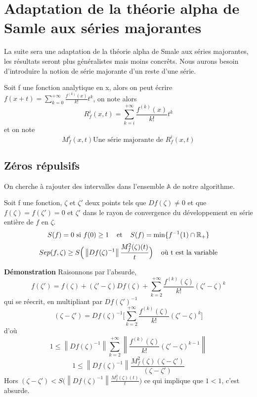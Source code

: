 \documentclass[a4paper,10.5pt]{article}
\begin{document}
	
	\section{Adaptation de la théorie alpha de Samle aux séries majorantes}
	
	La suite sera une adaptation de la théorie alpha de Smale aux séries majorantes, les résultats seront plus généralistes mais moins concrêts. 
	Nous aurons besoin d'introduire la notion de série majorante d'un reste d'une série. 
	
	\begin{definition} Soit f une fonction analytique en x, alors on peut écrire $f(x+t)=\sum_{k=0}^{+\infty} \frac{f^{(k)}(x)}{k!}t^{k}$, on note alors 
	\[R_{f}^{i}(x,t)=\sum_{k=i}^{+\infty} \frac{f^{(k)}(x)}{k!}t^{k}\]
	et on note
	\[M_{f}^{i}(x,t) \text{Une série majorante de } R_{f}^{i}(x,t)\]
	\end{definition}
	
	\subsection{Zéros répulsifs}
	
	On cherche à rajouter des intervalles dans l'ensemble $\mathbb{A}$ de notre algorithme. 
	
	\begin{theorem}	Soit f une fonction, $\zeta$ et $\zeta '$ deux points tels que $Df(\zeta)\neq 0$ et que $f(\zeta)=f(\zeta ')=0$ et $\zeta '$ dans le rayon de convergence du développement en série entière de $f$ en $\zeta$. 
		\[S(f)=0 \text{ si } f(0) \geq 1  \hspace{4mm} \text{et} \hspace{4mm} S(f)=\min \{f^{-1}(1)\cap \mathbb{R}_{+}\}\]
		\[Sep(f,\zeta) \geq S\Big(\left\|Df(\zeta)^{-1}\right\|\frac{M_{f}^{2}(\zeta)(t)}{t}\Big) \hspace{4mm} \text{où t est la variable} \]
	\end{theorem}
	
	\noindent \textbf{Démonstration} Raisonnons par l'absurde, 
	\[f(\zeta ')=f(\zeta)+(\zeta '-\zeta)Df(\zeta)+ \sum_{k=2}^{+\infty}\frac{f^{(k)}(\zeta)}{k!}(\zeta'-\zeta)^k\]
	qui se réecrit, en multipliant par $Df(\zeta ')^{-1}$
	\[(\zeta-\zeta')=Df(\zeta)^{-1} \Big[\sum_{k=2}^{+\infty}\frac{f^{(k)}(\zeta)}{k!}(\zeta'-\zeta)^k\Big]\]
	d'où 
	\[1 \leq \left\|Df(\zeta)^{-1} \right\|\sum_{k=2}^{+\infty}  \left\|\frac{f^{(k)}(\zeta)}{k!}(\zeta'-\zeta)^{k-1} \right\|\]
	\[1 \leq \left\|Df(\zeta)^{-1}\right\| \frac{M_{f}^{2}(\zeta)(\zeta-\zeta')}{(\zeta-\zeta')}\]
	Hors $(\zeta-\zeta')<S\Big(\left\|Df(\zeta)^{-1}\right\|\frac{M_{f}^{2}(\zeta)(t)}{t}\Big)$ ce qui implique que $1<1$, c'est absurde.
	
\end{document}
